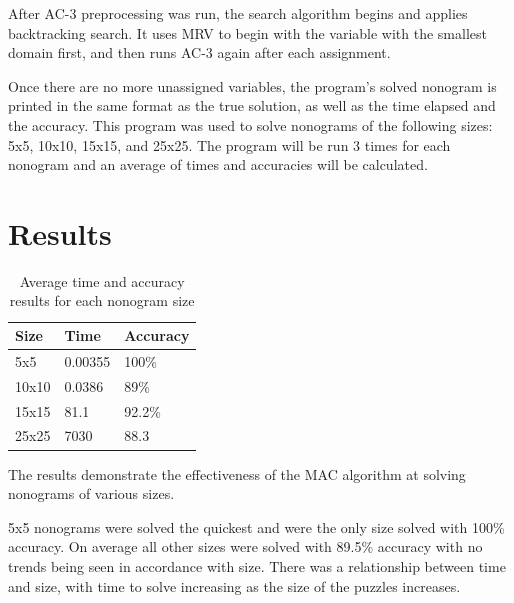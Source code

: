 \documentclass[12pt, letterpaper]
{article}
\begin{document}
After AC-3 preprocessing was run, the search algorithm begins and applies backtracking search. It uses MRV to begin with the variable with the smallest domain first, and then runs AC-3 again after each assignment.

Once there are no more unassigned variables, the program's solved nonogram is printed in the same format as the true solution, as well as the time elapsed and the accuracy. This program was used to solve nonograms of the following sizes: 5x5, 10x10, 15x15, and 25x25. The program will be run 3 times for each nonogram and an average of times and accuracies will be calculated.

\section{Results}
\begin{table}[!ht]
    \caption{Average time and accuracy results for each nonogram size}
    \centering
    \begin{tabular}{lll}
    \hline
        \textbf{Size} & \textbf{Time} & \textbf{Accuracy} \\ \hline
        5x5 & 0.00355 & 100\% \\ 
        10x10 & 0.0386 & 89\% \\ 
        15x15 & 81.1 & 92.2\% \\ 
        25x25 & 7030 & 88.3 \\ \hline
    \end{tabular}
\end{table}

The results demonstrate the effectiveness of the MAC algorithm at solving nonograms of various sizes. 

5x5 nonograms were solved the quickest and were the only size solved with 100\% accuracy. On average all other sizes were solved with 89.5\% accuracy with no trends being seen in accordance with size. There was a relationship between time and size, with time to solve increasing as the size of the puzzles increases.
\end{document}

